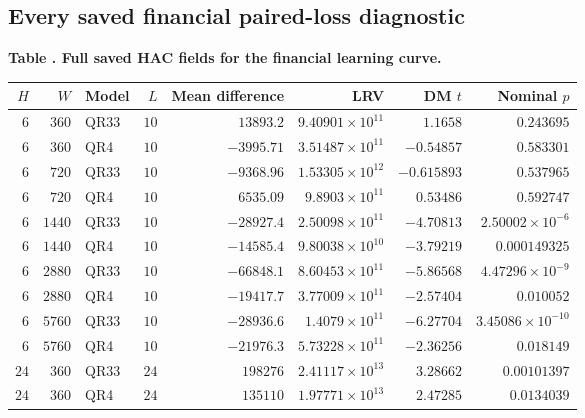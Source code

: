 \clearpage\subsection*{Every saved financial paired-loss diagnostic}
\begingroup\footnotesize\setlength{\tabcolsep}{3pt}
\label{tab:v9-complete-hac}
\noindent\textbf{Table \thetable. Full saved HAC fields for the financial learning curve.}\par
\begin{center}\begin{tabular}{rrlrrrrr}\toprule
$H$ & $W$ & Model & $L$ & Mean difference & LRV & DM $t$ & Nominal $p$ \\\midrule
$6$ & $360$ & QR33 & $10$ & $13893.2$ & $9.40901\times10^{11}$ & $1.1658$ & $0.243695$ \\ %
$6$ & $360$ & QR4 & $10$ & $-3995.71$ & $3.51487\times10^{11}$ & $-0.54857$ & $0.583301$ \\ %
$6$ & $720$ & QR33 & $10$ & $-9368.96$ & $1.53305\times10^{12}$ & $-0.615893$ & $0.537965$ \\ %
$6$ & $720$ & QR4 & $10$ & $6535.09$ & $9.8903\times10^{11}$ & $0.53486$ & $0.592747$ \\ %
$6$ & $1440$ & QR33 & $10$ & $-28927.4$ & $2.50098\times10^{11}$ & $-4.70813$ & $2.50002\times10^{-6}$ \\ %
$6$ & $1440$ & QR4 & $10$ & $-14585.4$ & $9.80038\times10^{10}$ & $-3.79219$ & $0.000149325$ \\ %
$6$ & $2880$ & QR33 & $10$ & $-66848.1$ & $8.60453\times10^{11}$ & $-5.86568$ & $4.47296\times10^{-9}$ \\ %
$6$ & $2880$ & QR4 & $10$ & $-19417.7$ & $3.77009\times10^{11}$ & $-2.57404$ & $0.010052$ \\ %
$6$ & $5760$ & QR33 & $10$ & $-28936.6$ & $1.4079\times10^{11}$ & $-6.27704$ & $3.45086\times10^{-10}$ \\ %
$6$ & $5760$ & QR4 & $10$ & $-21976.3$ & $5.73228\times10^{11}$ & $-2.36256$ & $0.018149$ \\ %
$24$ & $360$ & QR33 & $24$ & $198276$ & $2.41117\times10^{13}$ & $3.28662$ & $0.00101397$ \\ %
$24$ & $360$ & QR4 & $24$ & $135110$ & $1.97771\times10^{13}$ & $2.47285$ & $0.0134039$ \\ %

\end{tabular}
\end{center}
